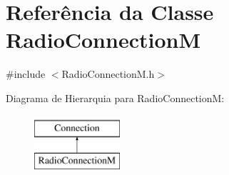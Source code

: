 \hypertarget{classRadioConnectionM}{\section{Referência da Classe Radio\-Connection\-M}
\label{classRadioConnectionM}
}


{\ttfamily \#include $<$Radio\-Connection\-M.\-h$>$}

Diagrama de Hierarquia para Radio\-Connection\-M\-:\begin{figure}[H]
\begin{center}
\leavevmode
\includegraphics[height=2.000000cm]{classRadioConnectionM}
\end{center}
\end{figure}
